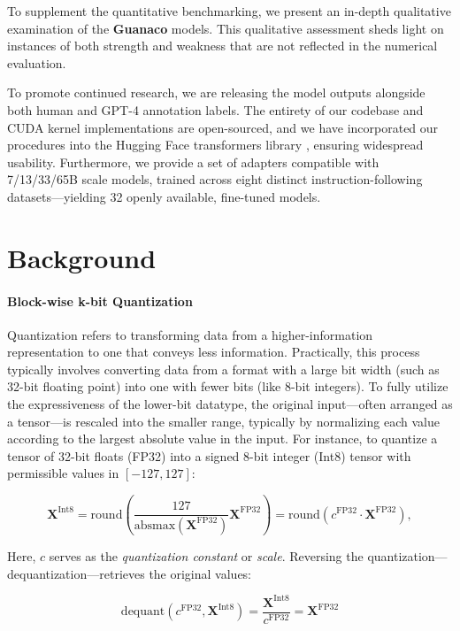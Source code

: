 To supplement the quantitative benchmarking, we present an in-depth qualitative examination of the \textbf{Guanaco} models. This qualitative assessment sheds light on instances of both strength and weakness that are not reflected in the numerical evaluation.

To promote continued research, we are releasing the model outputs alongside both human and GPT-4 annotation labels. The entirety of our codebase and CUDA kernel implementations are open-sourced, and we have incorporated our procedures into the Hugging Face transformers library \citep{wolf2019huggingface}, ensuring widespread usability. Furthermore, we provide a set of adapters compatible with 7/13/33/65B scale models, trained across eight distinct instruction-following datasets—yielding 32 openly available, fine-tuned models.

\section{Background}
\paragraph{Block-wise k-bit Quantization} 
Quantization refers to transforming data from a higher-information representation to one that conveys less information. Practically, this process typically involves converting data from a format with a large bit width (such as 32-bit floating point) into one with fewer bits (like 8-bit integers). To fully utilize the expressiveness of the lower-bit datatype, the original input—often arranged as a tensor—is rescaled into the smaller range, typically by normalizing each value according to the largest absolute value in the input. For instance, to quantize a tensor of 32-bit floats (FP32) into a signed 8-bit integer (Int8) tensor with permissible values in $[-127, 127]$:

\begin{equation}
    \mathbf{X}^{ \text{Int8}} = \text{round}\left( \frac{127}{{\text{absmax}}(\mathbf{X}^{{\text{FP32}}})}\mathbf{X}^{{\text{FP32}}} \right) = \text{round}(c^{\text{FP32}}\cdot \mathbf{X}^{{\text{FP32}}}),
\end{equation}

Here, $c$ serves as the {\em quantization constant} or {\em scale}. Reversing the quantization—dequantization—retrieves the original values:

\begin{equation}
    \text{dequant}(c^{\text{FP32}}, \mathbf{X}^{\text{Int8}}) = \frac{\mathbf{X}^{\text{Int8}}}{c^{\text{FP32}}} = \mathbf{X}^{\text{FP32}}
\end{equation}


